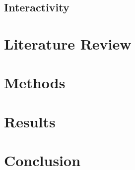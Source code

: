 \subsection{Interactivity}



\section{Literature Review}

\section{Methods}


\section{Results}

\section{Conclusion}
